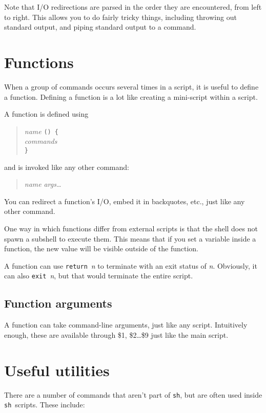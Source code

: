 \documentclass{article}
\newcommand{\code}[1]{\texttt{#1}}
\newcommand{\sh}{\code{sh}}
\begin{document}
	Note that I/O redirections are parsed in the order they are
encountered, from left to right. This allows you to do fairly tricky
things, including throwing out standard output, and piping standard
output to a command.

\section{Functions}

	When a group of commands occurs several times in a script, it
is useful to define a function. Defining a function is a lot like
creating a mini-script within a script.

	A function is defined using
\begin{quote}
\begin{tabbing}
\textit{name} \= \code{() \{}\\
	\> \textit{commands}\\
\code{\}}
\end{tabbing}
\end{quote}
and is invoked like any other command:
\begin{quote}
\textit{name} \textit{args\ldots}
\end{quote}

	You can redirect a function's I/O, embed it in backquotes,
etc., just like any other command.

	One way in which functions differ from external scripts is
that the shell does not spawn a subshell to execute them. This means
that if you set a variable inside a function, the new value will be
visible outside of the function.

	A function can use \code{return}~\textit{n} to terminate with
an exit status of \textit{n}. Obviously, it can also
\code{exit}~\textit{n}, but that would terminate the entire script.

\subsection{Function arguments}

	A function can take command-line arguments, just like any
script. Intuitively enough, these are available through \$1,
\$2\ldots\$9 just like the main script.

\section{Useful utilities}

	There are a number of commands that aren't part of \sh, but
are often used inside \sh\ scripts. These include:
\end{document}
